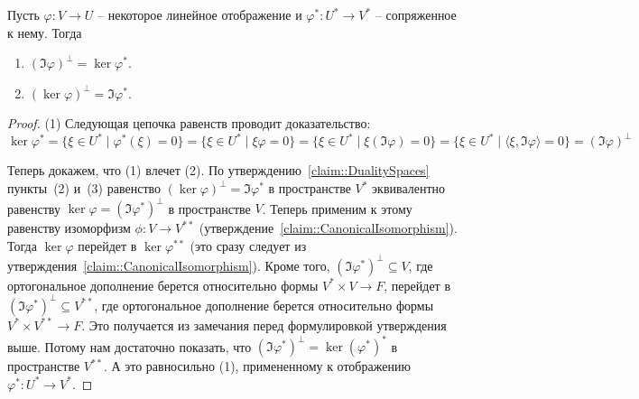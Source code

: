 \begin{claim}
\label{claim::Fredholm}
Пусть $\varphi\colon V\to U$ -- некоторое линейное отображение и $\varphi^*\colon U^*\to V^*$ -- сопряженное к нему.
Тогда
\begin{enumerate}
\item $(\Im \varphi)^\bot = \ker \varphi^*$.

\item $(\ker \varphi)^\bot = \Im \varphi^*$.
\end{enumerate}
\end{claim}
\begin{proof}
(1) Следующая цепочка равенств проводит доказательство:
\[
\ker\varphi^* =\{\xi \in U^*\mid \varphi^*(\xi) = 0\} = \{\xi \in U^*\mid \xi \varphi = 0\} = \{\xi\in U^*\mid \xi(\Im \varphi) = 0\} = \{\xi\in U^*\mid \langle \xi, \Im\varphi\rangle = 0\} = (\Im \varphi)^\bot
\]


Теперь докажем, что (1) влечет (2).
По утверждению~\ref{claim::DualitySpaces} пункты~(2) и~(3) равенство $(\ker \varphi)^\bot = \Im \varphi^*$ в пространстве $V^*$  эквивалентно равенству $\ker \varphi = (\Im \varphi^*)^\bot$ в пространстве $V$.
Теперь применим к этому равенству изоморфизм $\phi\colon V\to V^{**}$ (утверждение~\ref{claim::CanonicalIsomorphism}).
Тогда $\ker \varphi$ перейдет в $\ker \varphi^{**}$ (это сразу следует из утверждения~\ref{claim::CanonicalIsomorphism}).
Кроме того, $(\Im \varphi^*)^\bot \subseteq V$, где ортогональное дополнение берется относительно формы $V^*\times V\to F$, перейдет в $(\Im \varphi^*)^\bot\subseteq V^{**}$, где ортогональное дополнение берется относительно формы $V^*\times V^{**}\to F$.
Это получается из замечания перед формулировкой утверждения выше.
Потому нам достаточно показать, что $(\Im \varphi^*)^\bot = \ker(\varphi^*)^*$ в пространстве $V^{**}$.
А это равносильно (1), примененному к отображению $\varphi^*\colon U^*\to V^*$.
\end{proof}

